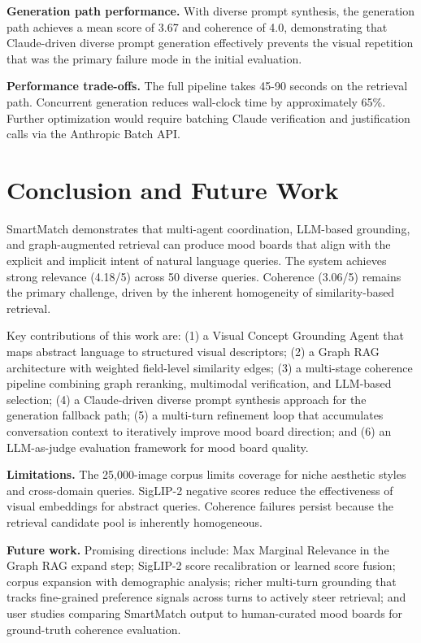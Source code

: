 \documentclass[
  11pt,
]{article}
\begin{document}
\textbf{Generation path performance.} With diverse prompt synthesis, the
generation path achieves a mean score of 3.67 and coherence of 4.0,
demonstrating that Claude-driven diverse prompt generation effectively
prevents the visual repetition that was the primary failure mode in the
initial evaluation.

\textbf{Performance trade-offs.} The full pipeline takes 45-90 seconds
on the retrieval path. Concurrent generation reduces wall-clock time by
approximately 65\%. Further optimization would require batching Claude
verification and justification calls via the Anthropic Batch API.

\section{Conclusion and Future Work}\label{conclusion-and-future-work}

SmartMatch demonstrates that multi-agent coordination, LLM-based
grounding, and graph-augmented retrieval can produce mood boards that
align with the explicit and implicit intent of natural language queries.
The system achieves strong relevance (4.18/5) across 50 diverse queries.
Coherence (3.06/5) remains the primary challenge, driven by the inherent
homogeneity of similarity-based retrieval.

Key contributions of this work are: (1) a Visual Concept Grounding Agent
that maps abstract language to structured visual descriptors; (2) a
Graph RAG architecture with weighted field-level similarity edges; (3) a
multi-stage coherence pipeline combining graph reranking, multimodal
verification, and LLM-based selection; (4) a Claude-driven diverse
prompt synthesis approach for the generation fallback path; (5) a
multi-turn refinement loop that accumulates conversation context to
iteratively improve mood board direction; and (6) an LLM-as-judge
evaluation framework for mood board quality.

\textbf{Limitations.} The 25,000-image corpus limits coverage for niche
aesthetic styles and cross-domain queries. SigLIP-2 negative scores
reduce the effectiveness of visual embeddings for abstract queries.
Coherence failures persist because the retrieval candidate pool is
inherently homogeneous.

\textbf{Future work.} Promising directions include: Max Marginal
Relevance in the Graph RAG expand step; SigLIP-2 score recalibration or
learned score fusion; corpus expansion with demographic analysis; richer
multi-turn grounding that tracks fine-grained preference signals across
turns to actively steer retrieval; and user studies comparing SmartMatch
output to human-curated mood boards for ground-truth coherence
evaluation.
\end{document}
